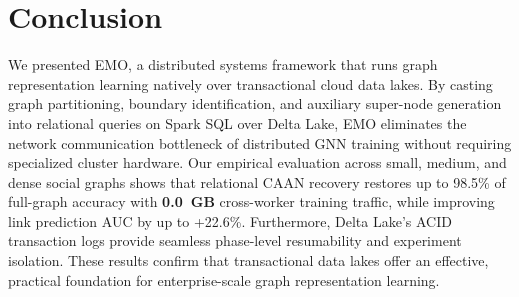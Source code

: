 \documentclass[conference,compsoc]{IEEEtran}
\begin{document}
\section{Conclusion}
We presented EMO, a distributed systems framework that runs graph representation learning natively over transactional cloud data lakes. By casting graph partitioning, boundary identification, and auxiliary super-node generation into relational queries on Spark SQL over Delta Lake, EMO eliminates the network communication bottleneck of distributed GNN training without requiring specialized cluster hardware. Our empirical evaluation across small, medium, and dense social graphs shows that relational CAAN recovery restores up to 98.5\% of full-graph accuracy with \textbf{0.0~GB} cross-worker training traffic, while improving link prediction AUC by up to +22.6\%. Furthermore, Delta Lake's ACID transaction logs provide seamless phase-level resumability and experiment isolation. These results confirm that transactional data lakes offer an effective, practical foundation for enterprise-scale graph representation learning.
\end{document}
